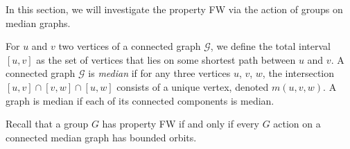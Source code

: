 \label{Section:Median}
In this section, we will investigate the property FW via the action of groups on median graphs.

For $u$ and $v$ two vertices of a connected graph $\mathcal G$, we define the total interval $[u,v]$ as the set of vertices that lies on some shortest path between $u$ and $v$.
A connected graph $\mathcal G$ is \emph{median} if for any three vertices $u$, $v$, $w$, the intersection $[u,v]\cap[v,w]\cap[u,w]$ consists of a unique vertex, denoted $m(u,v,w)$.
A graph is median if each of its connected components is median.

Recall that a group $G$ has property FW if and only if every $G$ action on a connected median graph has bounded orbits.

